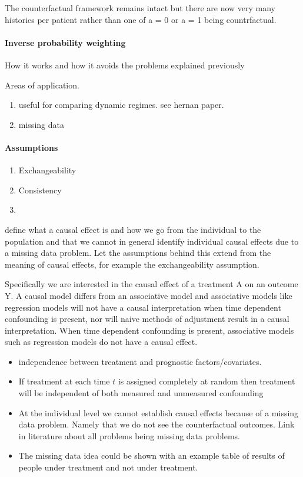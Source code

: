 \documentclass[11pt]{article}
\providecommand{\tightlist}{%
      \setlength{\itemsep}{0pt}\setlength{\parskip}{0pt}}
\begin{document}
The counterfactual framework remains intact but there are now very many
histories per patient rather than one of a = 0 or a = 1 being
countrfactual.

    \paragraph{Inverse probability
weighting}\label{inverse-probability-weighting}

How it works and how it avoids the problems explained previously

Areas of application.

\begin{enumerate}
\def\labelenumi{\arabic{enumi}.}
\tightlist
\item
  useful for comparing dynamic regimes. see hernan paper.
\item
  missing data
\end{enumerate}

    \paragraph{Assumptions}\label{assumptions}

\begin{enumerate}
\def\labelenumi{\arabic{enumi}.}
\item
  Exchangeability
\item
  Consistency
\item
\end{enumerate}

define what a causal effect is and how we go from the individual to the
population and that we cannot in general identify individual causal
effects due to a missing data problem. Let the assumptions behind this
extend from the meaning of causal effects, for example the
exchangeability assumption.

Specifically we are interested in the causal effect of a treatment A on
an outcome Y. A causal model differs from an associative model and
associative models like regression models will not have a causal
interpretation when time dependent confounding is present, nor will
naive methods of adjustment result in a causal interpretation. When time
dependent confounding is present, associative models such as regression
models do not have a causal effect.

\begin{itemize}
\tightlist
\item
  independence between treatment and prognostic factors/covariates.
\item
  If treatment at each time \(t\) is assigned completely at random then
  treatment will be independent of both measured and unmeasured
  confounding
\item
  At the individual level we cannot establish causal effects because of
  a missing data problem. Namely that we do not see the counterfactual
  outcomes. Link in literature about all problems being missing data
  problems.
\item
  The missing data idea could be shown with an example table of results
  of people under treatment and not under treatment.
\end{itemize}
\end{document}
